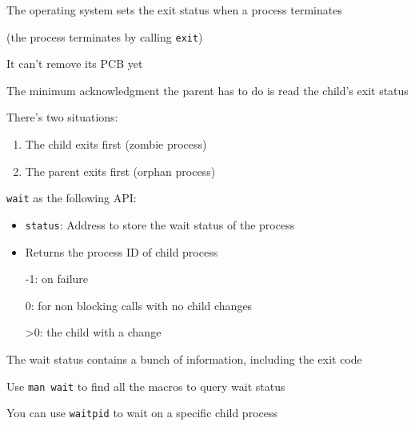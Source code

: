   \begin{slide}


    The operating system sets the exit status when a process terminates

    (the process terminates by calling \texttt{exit})

    \leftspace{}It can't remove its PCB yet
    \bigskip

    The minimum acknowledgment the parent has to do is read the child's exit status
    \bigskip

    There's two situations:
    \begin{enumerate}
      \item The child exits first (zombie process)
      \item The parent exits first (orphan process)
    \end{enumerate}

  \end{slide}

  \begin{slide}


    \texttt{wait} as the following API:
    \begin{itemize}
      \item \texttt{status}: Address to store the wait status of the process
      \item Returns the process ID of child process

            \leftspace{}-1: on failure

            \leftspace{}0: for non blocking calls with no child changes

            \leftspace{}>0: the child with a change
    \end{itemize}
    \bigskip

    The wait status contains a bunch of information, including the exit code

    \leftspace{}Use \texttt{man wait} to find all the macros to query wait status

    \leftspace{}\leftspace{}You can use \texttt{waitpid} to wait on a specific child process

  \end{slide}

